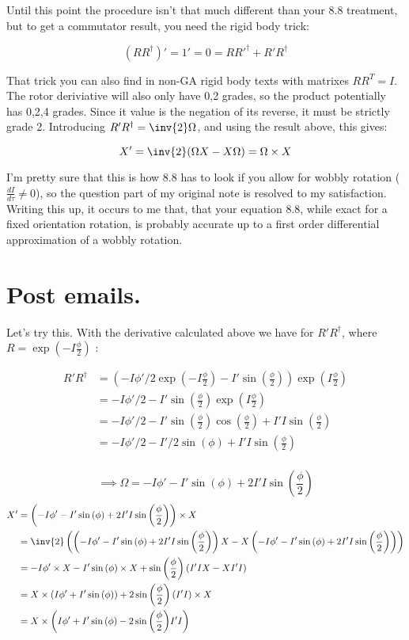 \documentclass{article}      %
\newcommand{\halfPhi}[0]{\frac{\phi}{2}}
\newcommand{\Sin}[1]{\sin{\left({#1}\right)}}
\newcommand{\Cos}[1]{\cos{\left({#1}\right)}}
\newcommand{\Exp}[1]{\exp{\left({#1}\right)}}
\begin{document}
Until this point the procedure isn't that much different than your 8.8 treatment, but to get a commutator result, you need the rigid body trick:

\[
(R R^\dagger)' = 1' = 0 = R {R'}^\dagger + R' R^\dagger
\]

That trick you can also find in non-GA rigid body texts with matrixes $R R^T = I$.  The rotor deriviative will also only have 0,2 grades, so the product potentially has 0,2,4 grades.  Since it value is the negation of its reverse, it must be strictly grade 2.  Introducing $R' R^\dagger = \inv{2} \Omega$, and using the result above, this gives:

\[
X' = \inv{2}(\Omega X - X \Omega) = \Omega \times X
\]


I'm pretty sure that this is how 8.8 has to look if you allow for wobbly rotation ($\frac{dI}{d\tau} \ne 0$), so the question part of my original note is resolved to my satisfaction.  Writing this up, it occurs to me that, that your equation 8.8, while exact for a fixed orientation rotation, is probably accurate up to a first order differential approximation of a wobbly rotation.

\section{ Post emails. }

Let's try this.  With the derivative calculated above we have for $R'R^\dagger$, where $R = \Exp{-I \halfPhi}$ :

\begin{align*}
R'R^\dagger 
&= \left(-I \phi'/2 \Exp{ -I \halfPhi } - I' \Sin{\halfPhi} \right)\Exp{ I \halfPhi } \\ 
&= -I \phi'/2 - I' \Sin{\halfPhi} \Exp{ I \halfPhi } \\
&= -I \phi'/2 - I' \Sin{\halfPhi}\Cos{\halfPhi} + I'I \Sin{\halfPhi} \\
&= -I \phi'/2 - I'/2 \Sin{\phi} + I'I \Sin{\halfPhi} \\
\end{align*}

\[
\implies
\Omega = -I \phi' - I' \Sin{\phi} + 2 I'I \Sin{\halfPhi}
\]
\begin{align*}
X'
&= \left( -I \phi' - I' \Sin{\phi} + 2 I'I \Sin{\halfPhi} \right) \times X \\
&= \inv{2} \left( \left( -I \phi' - I' \Sin{\phi} + 2 I'I \Sin{\halfPhi} \right) X - X \left( -I \phi' - I' \Sin{\phi} + 2 I'I \Sin{\halfPhi} \right) \right) \\
&= -I \phi' \times X  - I'\Sin{\phi} \times X + \Sin{\halfPhi} \left( I'I X - X I' I \right)  \\
&= X \times \left(I \phi' + I'\Sin{\phi} \right ) + 2 \Sin{\halfPhi} \left( I'I \right) \times X \\
&= X \times \left(I \phi' + I'\Sin{\phi} - 2 \Sin{\halfPhi} I'I \right) \\
\end{align*}
\end{document}
